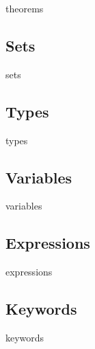 \documentclass[a4paper,10pt]{article}
\begin{document}
 {theorems}

\subsection {Sets}

 {sets}

\subsection {Types}
\label {types}

 {types}

\subsection {Variables}

 {variables}

\subsection {Expressions}

 {expressions}

\subsection {Keywords}
 {keywords}




\end{document}
